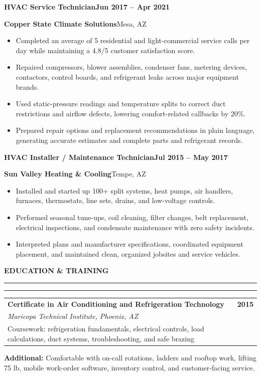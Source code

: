 \documentclass[10pt,letterpaper]{article}
\newcommand{\resumesection}[1]{%
  \vspace{4pt}%
  {\large\bfseries\color{navy}\MakeUppercase{#1}}\hspace{7pt}%
  {\color{orange}\rule[3.4pt]{0.28in}{1.5pt}}%
  \vspace{1.5pt}\par
  {\color{rule}\rule{\textwidth}{0.45pt}}%
  \vspace{1.8pt}\par
}
\newcommand{\job}[4]{%
  \textbf{\color{ink}#1}\hfill\textbf{\color{navy}#4}\par
  {\small\bfseries\color{blue}#2}\hfill{\small\color{muted}#3}\par
  \vspace{-1pt}%
}
\begin{document}
\vspace{1.5pt}
\job{HVAC Service Technician}{Copper State Climate Solutions}{Mesa, AZ}{Jun 2017 -- Apr 2021}
\begin{itemize}
  \item Completed an average of 5 residential and light-commercial service calls per day while maintaining a 4.8/5 customer satisfaction score.
  \item Repaired compressors, blower assemblies, condenser fans, metering devices, contactors, control boards, and refrigerant leaks across major equipment brands.
  \item Used static-pressure readings and temperature splits to correct duct restrictions and airflow defects, lowering comfort-related callbacks by 20\%.
  \item Prepared repair options and replacement recommendations in plain language, generating accurate estimates and complete parts and refrigerant records.
\end{itemize}

\vspace{1.5pt}
\job{HVAC Installer / Maintenance Technician}{Sun Valley Heating \& Cooling}{Tempe, AZ}{Jul 2015 -- May 2017}
\begin{itemize}
  \item Installed and started up 100+ split systems, heat pumps, air handlers, furnaces, thermostats, line sets, drains, and low-voltage controls.
  \item Performed seasonal tune-ups, coil cleaning, filter changes, belt replacement, electrical inspections, and condensate maintenance with zero safety incidents.
  \item Interpreted plans and manufacturer specifications, coordinated equipment placement, and maintained clean, organized jobsites and service vehicles.
\end{itemize}

\resumesection{Education \& Training}
\begin{tabularx}{\textwidth}{@{}Xr@{}}
  \textbf{Certificate in Air Conditioning and Refrigeration Technology} & \textbf{2015} \\
  \textit{Maricopa Technical Institute, Phoenix, AZ} & \\
  Coursework: refrigeration fundamentals, electrical controls, load calculations, duct systems, troubleshooting, and safe brazing &
\end{tabularx}

\vspace{4pt}
{\small\textbf{Additional:} Comfortable with on-call rotations, ladders and rooftop work, lifting 75 lb, mobile work-order software, inventory control, and customer-facing service.}
\end{document}

